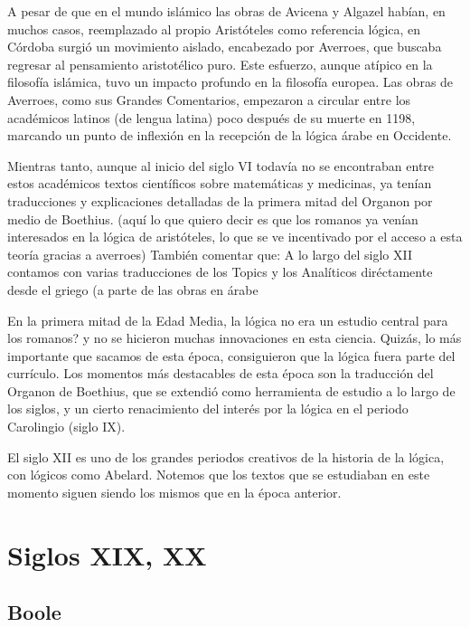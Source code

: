 \documentclass{article}
\begin{document}
A pesar de que en el mundo islámico las obras de Avicena y Algazel habían, en muchos casos, reemplazado al propio Aristóteles como referencia lógica, en Córdoba surgió un movimiento aislado, encabezado por Averroes, que buscaba regresar al pensamiento aristotélico puro. Este esfuerzo, aunque atípico en la filosofía islámica, tuvo un impacto profundo en la filosofía europea. Las obras de Averroes, como sus Grandes Comentarios, empezaron a circular entre los académicos latinos (de lengua latina) poco después de su muerte en 1198, marcando un punto de inflexión en la recepción de la lógica árabe en Occidente. \cite{street2001arabic, charles2004latin}

Mientras tanto, aunque al inicio del siglo VI todavía no se encontraban entre estos académicos textos científicos sobre matemáticas y medicinas, ya tenían traducciones y explicaciones detalladas de la primera mitad del Organon por medio de Boethius. (aquí lo que quiero decir es que los romanos ya venían interesados en la lógica de aristóteles, lo que se ve incentivado por el acceso a esta teoría gracias a averroes) También comentar que: A lo largo del siglo XII contamos con varias traducciones de los Topics y los Analíticos diréctamente desde el griego (a parte de las obras en árabe  \cite{charles2004latin}

En la primera mitad de la Edad Media, la lógica no era un estudio central para los romanos? y no se hicieron muchas innovaciones en esta ciencia. Quizás, lo más importante que sacamos de esta época, consiguieron que la lógica fuera parte del currículo. Los momentos más destacables de esta época son la traducción del Organon de Boethius, que se extendió como herramienta de estudio a lo largo de los siglos, y un cierto renacimiento del interés por la lógica en el periodo Carolingio (siglo IX). 

El siglo XII es uno de los grandes periodos creativos de la historia de la lógica, con lógicos como Abelard. Notemos que los textos que se estudiaban en este momento siguen siendo los mismos que en la época anterior. \cite{marebon2008logic} 


\section{Siglos XIX, XX}

\subsection{Boole}
\end{document}
